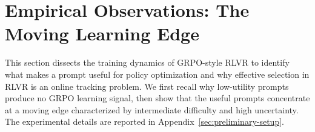 \section{Empirical Observations: The Moving Learning Edge}
\label{sec:obs-preliminary}
This section dissects the training dynamics of GRPO-style RLVR to identify what makes a 
prompt useful for policy optimization and why effective selection in RLVR is an online tracking problem. 
We first recall why low-utility prompts produce no GRPO learning signal, then show that the useful 
prompts concentrate at a moving edge characterized by intermediate difficulty and high uncertainty. {The experimental details are reported in Appendix~\ref{sec:preliminary-setup}.}




